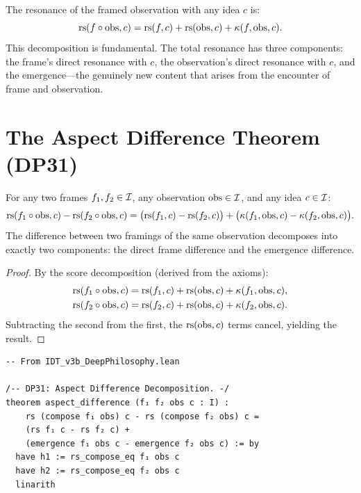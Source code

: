 The resonance of the framed observation with any idea $c$ is:
\[
\mathrm{rs}(f \circ \mathrm{obs}, c) = \mathrm{rs}(f, c) + \mathrm{rs}(\mathrm{obs}, c) +
\kappa(f, \mathrm{obs}, c).
\]
This decomposition is fundamental.  The total resonance has three
components: the frame's direct resonance with $c$, the observation's
direct resonance with $c$, and the emergence---the genuinely new
content that arises from the encounter of frame and observation.

\section{The Aspect Difference Theorem (DP31)}

\begin{theorem}
\label{thm:aspect-difference}
For any two frames $f_1, f_2 \in \mathcal{I}$, any observation
$\mathrm{obs} \in \mathcal{I}$, and any idea $c \in \mathcal{I}$:
\[
\mathrm{rs}(f_1 \circ \mathrm{obs}, c) - \mathrm{rs}(f_2 \circ \mathrm{obs}, c) =
\bigl(\mathrm{rs}(f_1, c) - \mathrm{rs}(f_2, c)\bigr) +
\bigl(\kappa(f_1, \mathrm{obs}, c) - \kappa(f_2, \mathrm{obs}, c)\bigr).
\]
The difference between two framings of the same observation decomposes
into exactly two components: the direct frame difference and the
emergence difference.
\end{theorem}

\begin{proof}
By the score decomposition (derived from the axioms):
\begin{align*}
\mathrm{rs}(f_1 \circ \mathrm{obs}, c) &= \mathrm{rs}(f_1, c) + \mathrm{rs}(\mathrm{obs}, c) +
\kappa(f_1, \mathrm{obs}, c), \\
\mathrm{rs}(f_2 \circ \mathrm{obs}, c) &= \mathrm{rs}(f_2, c) + \mathrm{rs}(\mathrm{obs}, c) +
\kappa(f_2, \mathrm{obs}, c).
\end{align*}
Subtracting the second from the first, the $\mathrm{rs}(\mathrm{obs}, c)$ terms
cancel, yielding the result.
\end{proof}

\begin{lstlisting}
-- From IDT_v3b_DeepPhilosophy.lean

/-- DP31: Aspect Difference Decomposition. -/
theorem aspect_difference (f₁ f₂ obs c : I) :
    rs (compose f₁ obs) c - rs (compose f₂ obs) c =
    (rs f₁ c - rs f₂ c) +
    (emergence f₁ obs c - emergence f₂ obs c) := by
  have h1 := rs_compose_eq f₁ obs c
  have h2 := rs_compose_eq f₂ obs c
  linarith
\end{lstlisting}

